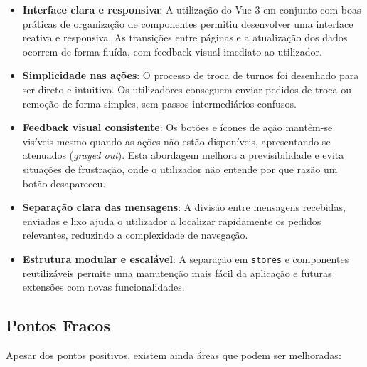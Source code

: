 \documentclass{article}
\begin{document}
\begin{itemize}
    \item \textbf{Interface clara e responsiva}: A utilização do Vue 3 em conjunto com boas práticas de organização de componentes permitiu desenvolver uma interface reativa e responsiva. As transições entre páginas e a atualização dos dados ocorrem de forma fluída, com feedback visual imediato ao utilizador.
    
    \item \textbf{Simplicidade nas ações}: O processo de troca de turnos foi desenhado para ser direto e intuitivo. Os utilizadores conseguem enviar pedidos de troca ou remoção de forma simples, sem passos intermediários confusos.
    
    \item \textbf{Feedback visual consistente}: Os botões e ícones de ação mantêm-se visíveis mesmo quando as ações não estão disponíveis, apresentando-se atenuados (\textit{grayed out}). Esta abordagem melhora a previsibilidade e evita situações de frustração, onde o utilizador não entende por que razão um botão desapareceu.
    
    \item \textbf{Separação clara das mensagens}: A divisão entre mensagens recebidas, enviadas e lixo ajuda o utilizador a localizar rapidamente os pedidos relevantes, reduzindo a complexidade de navegação.
    
    \item \textbf{Estrutura modular e escalável}: A separação em \texttt{stores} e componentes reutilizáveis permite uma manutenção mais fácil da aplicação e futuras extensões com novas funcionalidades.
\end{itemize}

\subsection{Pontos Fracos}

Apesar dos pontos positivos, existem ainda áreas que podem ser melhoradas:
\end{document}
